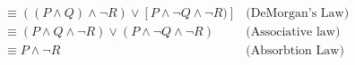 
\begin{align*}
  &\equiv ((P \land Q) \land \lnot R) \lor [P \land \lnot Q \land \lnot R)]
    &\textrm{(DeMorgan's Law)}\\
  &\equiv (P \land Q \land \lnot R) \lor (P \land \lnot Q \land \lnot R)
    &\textrm{(Associative law)}\\
  &\equiv P \land \lnot R &\textrm{(Absorbtion Law)}
\end{align*}
